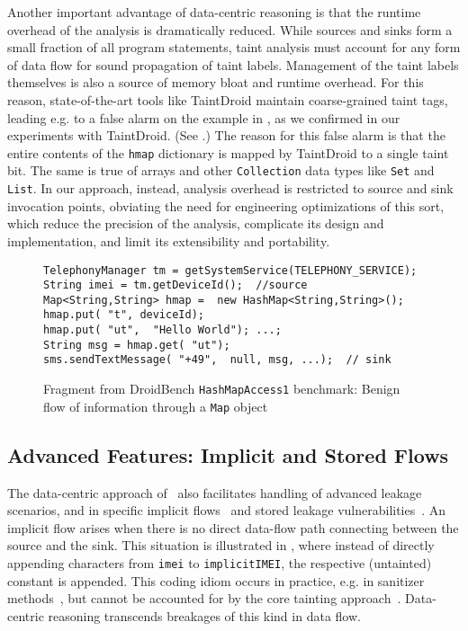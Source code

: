 \noindent Another important advantage of data-centric reasoning is that the runtime overhead of the analysis is dramatically reduced. While sources and sinks form a small fraction of all program statements, taint analysis must account for any form of data flow for sound propagation of taint labels. Management of the taint labels themselves is also a source of memory bloat and runtime overhead. For this reason, state-of-the-art tools like TaintDroid maintain coarse-grained taint tags, leading e.g. to a false alarm on the example in , as we confirmed in our experiments with TaintDroid. (See .) The reason for this false alarm is that the entire contents of the {\tt hmap} dictionary is mapped by TaintDroid to a single taint bit. The same is true of arrays and other {\tt Collection} data types like {\tt Set} and {\tt List}. In our approach, instead, analysis overhead is restricted to source and sink invocation points, obviating the need for engineering optimizations of this sort, which reduce the precision of the analysis, complicate its design and implementation, and limit its extensibility and portability.

\begin{figure}
\begin{small}
{\tt TelephonyManager tm = getSystemService(TELEPHONY\_SERVICE);} \\
{\tt String imei = tm.getDeviceId(); {\color{green} //source}} \\
{\tt Map<String,String> hmap = {\color{blue} new} HashMap<String,String>();} \\
{\tt hmap.put({\color{purple} "t"}, deviceId);} \\
{\tt hmap.put({\color{purple} "ut"}, {\color{purple} "Hello World"}); ...;} \\
{\tt String msg = hmap.get({\color{purple} "ut"});} \\
{\tt sms.sendTextMessage({\color{purple} "+49"}, {\color{blue} null}, msg, ...); {\color{green} // sink}}
\end{small}
\caption{\label{Fi:hashmap} Fragment from DroidBench {\tt HashMapAccess1} benchmark: Benign flow of information through a {\tt Map} object}
\end{figure}

\subsection{Advanced Features: Implicit and Stored Flows}

The data-centric approach of \Tool\ also facilitates handling of advanced leakage scenarios, and in specific implicit flows~\cite{SM:SAC03,ME:PLDI08} and stored leakage vulnerabilities~\cite{KGJE:ICSE09}.  An implicit flow arises when there is no direct data-flow path connecting between the source and the sink. This situation is illustrated in , where instead of directly appending characters from {\tt imei} to {\tt implicitIMEI}, the respective (untainted) constant is appended. This coding idiom occurs in practice, e.g. in sanitizer methods~\cite{TPT:ISSTA11}, but cannot be accounted for by the core tainting approach~\cite{F:CJ74,MPL:SRE:04}. Data-centric reasoning transcends breakages of this kind in data flow.


